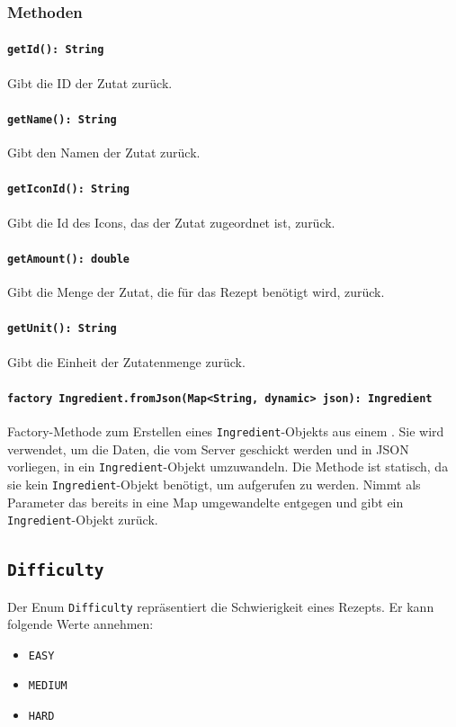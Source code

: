 \documentclass[parskip=full]{scrartcl}
\begin{document}
\subsubsection*{Methoden}
\paragraph{\texttt{getId(): String}}
Gibt die ID der Zutat zurück.
\paragraph{\texttt{getName(): String}}
Gibt den Namen der Zutat zurück.
\paragraph{\texttt{getIconId(): String}}
Gibt die Id des Icons, das der Zutat zugeordnet ist, zurück.
\paragraph{\texttt{getAmount(): double}}
Gibt die Menge der Zutat, die für das Rezept benötigt wird, zurück.
\paragraph{\texttt{getUnit(): String}}
Gibt die Einheit der Zutatenmenge zurück.
\paragraph{\texttt{factory Ingredient.fromJson(Map<String, dynamic> json): Ingredient}}
Factory-Methode zum Erstellen eines \texttt{Ingredient}-Objekts aus einem . Sie wird verwendet, um die Daten, die vom Server geschickt werden und in \Gls{JSON} vorliegen, in ein \texttt{Ingredient}-Objekt umzuwandeln. Die Methode ist statisch, da sie kein \texttt{Ingredient}-Objekt benötigt, um aufgerufen zu werden. Nimmt als Parameter das bereits in eine Map umgewandelte  entgegen und gibt ein \texttt{Ingredient}-Objekt zurück.

\newpage
\subsection{\texttt{Difficulty}}
Der Enum \texttt{Difficulty} repräsentiert die Schwierigkeit eines Rezepts. Er kann folgende Werte annehmen:
\begin{itemize}
    \item \texttt{EASY}
    \item \texttt{MEDIUM}
    \item \texttt{HARD}
\end{itemize}
\newpage
\end{document}
